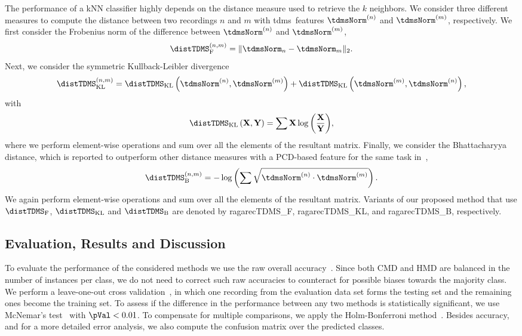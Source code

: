 The performance of a kNN classifier highly depends on the distance measure used to retrieve the $k$ neighbors. We consider three different measures to compute the distance between two recordings $n$ and $m$ with \gls{tdms}\ features $\tdmsNorm^{(n)}$ and $\tdmsNorm^{(m)}$, respectively. We first consider the Frobenius norm of the difference between $\tdmsNorm^{(n)}$ and $\tdmsNorm^{(m)}$,
\begin{equation*}
\distTDMS_{\mathrm{F}}^{(n,m)} = \norm{\tdmsNorm_{n} - \tdmsNorm_{m}}_2 .
\end{equation*}
Next, we consider the symmetric Kullback-Leibler divergence
\begin{equation*}
\distTDMS_{\mathrm{KL}}^{(n,m)} = \distTDMS_{\mathrm{KL}}\left(\tdmsNorm^{(n)},\tdmsNorm^{(m)}\right) + \distTDMS_{\mathrm{KL}}\left(\tdmsNorm^{(m)},\tdmsNorm^{(n)}\right) ,
\end{equation*}
with
\begin{equation*}
\distTDMS_{\mathrm{KL}}\left(\mathbf{X},\mathbf{Y}\right) = \sum{\mathbf{X} \log\left(\frac{\mathbf{X}}{\mathbf{Y}} \right)} ,
\end{equation*}
where we perform element-wise operations and sum over all the elements of the resultant matrix. Finally, we consider the Bhattacharyya distance, which is reported to outperform other distance measures with a PCD-based feature for the same task in~\cite{chordia2013joint},
\begin{equation*}
\distTDMS_{\mathrm{B}}^{(n,m)} = -\log\left( \sum{ \sqrt{ \tdmsNorm^{(n)} \cdot \tdmsNorm^{(m)} } } \right) .
\end{equation*}
We again perform element-wise operations and sum over all the elements of the resultant matrix. Variants of our proposed method that use $\distTDMS_{\mathrm{F}}$, $\distTDMS_{\mathrm{KL}}$ and $\distTDMS_{\mathrm{B}}$ are denoted by \acrshort{ragarecTDMS_F}, \acrshort{ragarecTDMS_KL}, and \acrshort{ragarecTDMS_B}, respectively.



\subsection{Evaluation, Results and Discussion}
\label{sec:tdms_eval_results}

To evaluate the performance of the considered methods we use the raw overall accuracy~\cite{Mitchell97BOOK}. Since both CMD and HMD are balanced in the number of instances per class, we do not need to correct such raw accuracies to counteract for possible biases towards the majority class. We perform a leave-one-out cross validation~\cite{Mitchell97BOOK}, in which one recording from the evaluation data set forms the testing set and the remaining ones become the training set. To assess if the difference in the performance between any two methods is statistically significant, we use McNemar's test~\cite{mcnemar1947note} with $\pVal < 0.01$. To compensate for multiple comparisons, we apply the Holm-Bonferroni method~\cite{holm1979simple}. Besides accuracy, and for a more detailed error analysis, we also compute the confusion matrix over the predicted classes.

